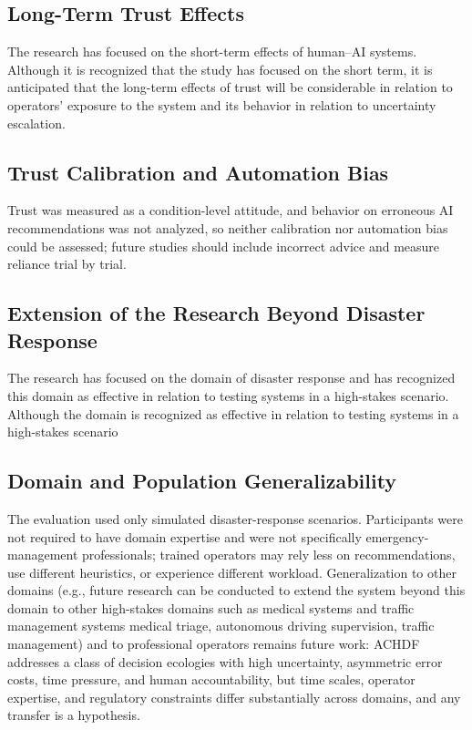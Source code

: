 \documentclass[journal]{IEEEtran}
\theoremstyle{plain}
\theoremstyle{definition}
\providecommand{\DIFaddtex}[1]{{\protect\color{blue} \sf #1}} %
\providecommand{\DIFdeltex}[1]{{\protect\color{red} \scriptsize #1}} %
\providecommand{\DIFaddbegin}{} %
\providecommand{\DIFaddend}{} %
\providecommand{\DIFdelbegin}{} %
\providecommand{\DIFdelend}{} %
\providecommand{\DIFadd}[1]{\texorpdfstring{\DIFaddtex{#1}}{#1}} %
\providecommand{\DIFdel}[1]{\texorpdfstring{\DIFdeltex{#1}}{}} %
\newcommand{\DIFscaledelfig}{0.5}
\newlength{\DIFdelgraphicswidth} %
\newlength{\DIFdelgraphicsheight} %
\newcommand{\DIFaddincludegraphics}[2][]{{\color{blue}\fbox{\DIFOincludegraphics[#1]{#2}}}} %
\newcommand{\DIFdelincludegraphics}[2][]{%
\sbox{\DIFdelgraphicsbox}{\DIFOincludegraphics[#1]{#2}}%
\settoboxwidth{\DIFdelgraphicswidth}{\DIFdelgraphicsbox} %
\settoboxtotalheight{\DIFdelgraphicsheight}{\DIFdelgraphicsbox} %
\scalebox{\DIFscaledelfig}{%
\parbox[b]{\DIFdelgraphicswidth}{\usebox{\DIFdelgraphicsbox}\\[-\baselineskip] \rule{\DIFdelgraphicswidth}{0em}}\llap{\resizebox{\DIFdelgraphicswidth}{\DIFdelgraphicsheight}{%
\setlength{\unitlength}{\DIFdelgraphicswidth}%
\begin{picture}(1,1)%
\thicklines\linethickness{2pt} %
{\color[rgb]{1,0,0}\put(0,0){\framebox(1,1){}}}%
{\color[rgb]{1,0,0}\put(0,0){\line( 1,1){1}}}%
{\color[rgb]{1,0,0}\put(0,1){\line(1,-1){1}}}%
\end{picture}%
}\hspace*{3pt}}} %
} %
\DeclareRobustCommand{\DIFaddbegin}{\DIFOaddbegin \let\includegraphics\DIFaddincludegraphics} %
\DeclareRobustCommand{\DIFaddend}{\DIFOaddend \let\includegraphics\DIFOincludegraphics} %
\DeclareRobustCommand{\DIFdelbegin}{\DIFOdelbegin \let\includegraphics\DIFdelincludegraphics} %
\DeclareRobustCommand{\DIFdelend}{\DIFOaddend \let\includegraphics\DIFOincludegraphics} %
\begin{document}
    \DIFdelbegin \subsection{\DIFdel{Long-Term Trust Effects}}
\addtocounter{subsection}{-1}%
\DIFdel{The research has focused on the short-term effects of human--AI systems. Although it is recognized that the study has focused on the short term, it is anticipated that the long-term effects of trust will be considerable in relation to operators' exposure to the system and its behavior in relation to uncertainty escalation. }\DIFdelend \DIFaddbegin \subsection{\DIFadd{Trust Calibration and Automation Bias}}
    \DIFadd{Trust was measured as a condition-level attitude, and behavior on erroneous AI recommendations was not analyzed, so neither calibration nor automation bias could be assessed; future studies should include incorrect advice and measure reliance trial by trial.
}\DIFaddend 

    \DIFdelbegin \subsection{\DIFdel{Extension of the Research Beyond Disaster Response}}
\addtocounter{subsection}{-1}%
\DIFdel{The research has focused on the domain of disaster response and has recognized this domain as effective in relation to testing systems in a high-stakes scenario.
    Although the domain is recognized as effective in relation to testing systems in a high-stakes scenario }\DIFdelend \DIFaddbegin \subsection{\DIFadd{Domain and Population Generalizability}}
    \DIFadd{The evaluation used only simulated disaster-response scenarios. Participants were not required to have domain expertise and were not specifically emergency-management professionals; trained operators may rely less on recommendations, use different heuristics, or experience different workload. Generalization to other domains (e.g.}\DIFaddend , \DIFdelbegin \DIFdel{future research can be conducted to extend the system beyond this domain to other high-stakes domains such as medical systems and traffic management systems}\DIFdelend \DIFaddbegin \DIFadd{medical triage, autonomous driving supervision, traffic management) and to professional operators remains future work: ACHDF addresses a class of decision ecologies with high uncertainty, asymmetric error costs, time pressure, and human accountability, but time scales, operator expertise, and regulatory constraints differ substantially across domains, and any transfer is a hypothesis.
}
\end{document}

